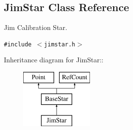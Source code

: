 \subsection{Jim\-Star  Class Reference}
\label{class_jimstar}
Jim Calibration Star. 


{\tt \#include $<$jimstar.h$>$}

Inheritance diagram for Jim\-Star::\begin{figure}[H]
\begin{center}
\leavevmode
\includegraphics[height=3cm]{class_jimstar}
\end{center}
\end{figure}
